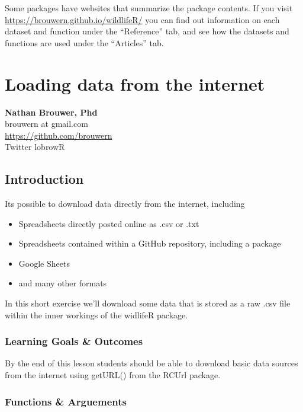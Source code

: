 \documentclass[]{book}
\providecommand{\tightlist}{%
  \setlength{\itemsep}{0pt}\setlength{\parskip}{0pt}}
\theoremstyle{definition}
\theoremstyle{definition}
\theoremstyle{definition}
\theoremstyle{remark}
\begin{document}
Some packages have websites that summarize the package contents. If you
visit \url{https://brouwern.github.io/wildlifeR/} you can find out
information on each dataset and function under the ``Reference'' tab,
and see how the datasets and functions are used under the ``Articles''
tab.

\chapter{Loading data from the
internet}\label{loading-data-from-the-internet}

\textbf{Nathan Brouwer, Phd}\\
brouwern at gmail.com\\
\url{https://github.com/brouwern}\\
Twitter lobrowR

\section{Introduction}\label{introduction-3}

Its possible to download data directly from the internet, including

\begin{itemize}
\tightlist
\item
  Spreadsheets directly posted online as .csv or .txt
\item
  Spreadsheets contained within a GitHub repository, including a package
\item
  Google Sheets
\item
  and many other formats
\end{itemize}

In this short exercise we'll download some data that is stored as a raw
.csv file within the inner workings of the widlifeR package.

\subsection{Learning Goals \& Outcomes}\label{learning-goals-outcomes}

By the end of this lesson students should be able to download basic data
sources from the internet using getURL() from the RCUrl package.

\subsection{Functions \& Arguements}\label{functions-arguements-2}
\end{document}

